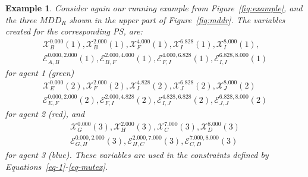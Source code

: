 \documentclass[review]{elsarticle}
\newtheorem{example}{Example}
\newcommand{\mddr}{\ensuremath{MDD_R}\xspace}
\newcommand\konstantin[1]{\nb{\textbf{Konstantin:}}{red}{#1}}
\newcommand\roni[1]{\nb{\textbf{Roni:}}{green}{#1}}
\newcommand\pavel[1]{\nb{\textbf{Pavel:}}{blue}{#1}}
\newcommand{\ps}{\ac{PS}\xspace}
\begin{document}
\begin{example}
Consider again our running example from Figure~\ref{fig:example}, 
and the three \mddr shown in the upper part of Figure~\ref{fig:mddr}. 
The variables created for the corresponding \ps , are:
\begin{multline*}
\mathcal{X}_B^{0.000}(1), \mathcal{X}_B^{2.000}(1), \mathcal{X}_F^{4.000}(1), \mathcal{X}_I^{6.828}(1), \mathcal{X}_I^{8.000}(1), \\
\mathcal{E}_{A,B}^{0.000,2.000}(1), \mathcal{E}_{B,F}^{2.000,4.000}(1), \mathcal{E}_{F,I}^{4.000,6.828}(1), \mathcal{E}_{I,I}^{6.828,8.000}(1)    
\end{multline*}
for agent 1 (green)
\begin{multline*}
    \mathcal{X}_E^{0.000}(2), \mathcal{X}_F^{2.000}(2), \mathcal{X}_I^{4.828}(2), \mathcal{X}_J^{6.828}(2), \mathcal{X}_J^{8.000}(2)\\
\mathcal{E}_{E,F}^{0.000,2.000}(2), \mathcal{E}_{F,I}^{2.000,4.828}(2), \mathcal{E}_{I,J}^{4.828,6.828}(2), \mathcal{E}_{J,J}^{6.828,8.000}(2)
\end{multline*}    
for agent 2 (red), and 
\begin{multline*}
    \mathcal{X}_G^{0.000}(3), \mathcal{X}_H^{2.000}(3), \mathcal{X}_C^{7.000}(3), \mathcal{X}_D^{8.000}(3) \\
\mathcal{E}_{G,H}^{0.000,2.000}(3), \mathcal{E}_{H,C}^{2.000,7.000}(3), \mathcal{E}_{C,D}^{7.000,8.000}(3)
\end{multline*}
for agent 3 (blue). 
These variables are used in the constraints defined by Equations~\ref{eq-1}-\ref{eq-mutex}. 

\end{example}
\end{document}
